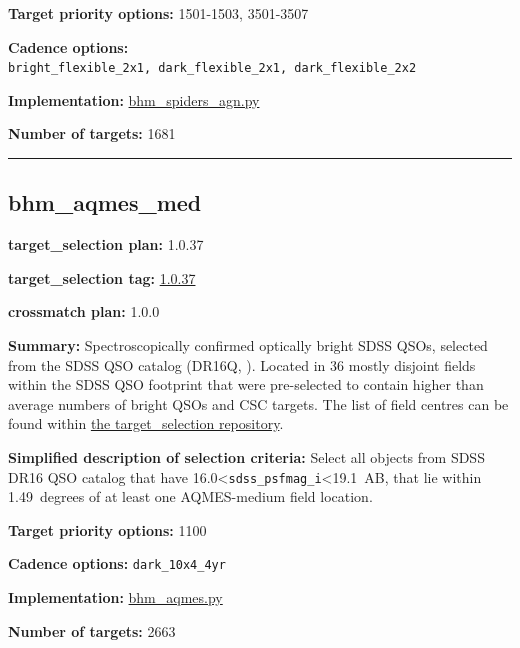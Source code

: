 \noindent\textbf{Target priority options:} 1501-1503, 3501-3507

\noindent\textbf{Cadence options:}
\texttt{bright\_flexible\_2x1,\ dark\_flexible\_2x1,\ dark\_flexible\_2x2}

\noindent\textbf{Implementation:}
\href{https://github.com/sdss/target_selection/blob/1.0.37/python/target_selection/cartons/bhm_spiders_agn.py}{bhm\_spiders\_agn.py}

\noindent\textbf{Number of targets:} 1681

\begin{center}\rule{0.5\linewidth}{0.5pt}\end{center}

\hypertarget{bhm_aqmes_med_plan1.0.37}{%
\subsection{bhm\_aqmes\_med}\label{bhm_aqmes_med_plan1.0.37}}

\noindent\textbf{target\_selection plan:} 1.0.37

\noindent\textbf{target\_selection tag:}
\href{https://github.com/sdss/target_selection/tree/1.0.37/}{1.0.37}

\noindent\textbf{crossmatch plan:} 1.0.0

\noindent\textbf{Summary:} Spectroscopically confirmed optically bright SDSS
QSOs, selected from the SDSS QSO catalog (DR16Q,
\citealt{Lyke2020}). Located in 36 mostly disjoint fields within the SDSS QSO
footprint that were pre-selected to contain higher than average numbers
of bright QSOs and CSC targets. The list of field centres can be found
within
\href{https://github.com/sdss/target_selection/blob/0.3.0/python/target_selection/masks/candidate_target_fields_bhm_aqmes_med_v0.3.1.fits}{the
target\_selection repository}.

\noindent\textbf{Simplified description of selection criteria:} Select all
objects from SDSS DR16 QSO catalog that have
16.0\textless{}\texttt{sdss\_psfmag\_i}\textless19.1~AB, that lie within
1.49~degrees of at least one AQMES-medium field location.


\noindent\textbf{Target priority options:} 1100

\noindent\textbf{Cadence options:} \texttt{dark\_10x4\_4yr}

\noindent\textbf{Implementation:}
\href{https://github.com/sdss/target_selection/blob/1.0.37/python/target_selection/cartons/bhm_aqmes.py}{bhm\_aqmes.py}

\noindent\textbf{Number of targets:} 2663


